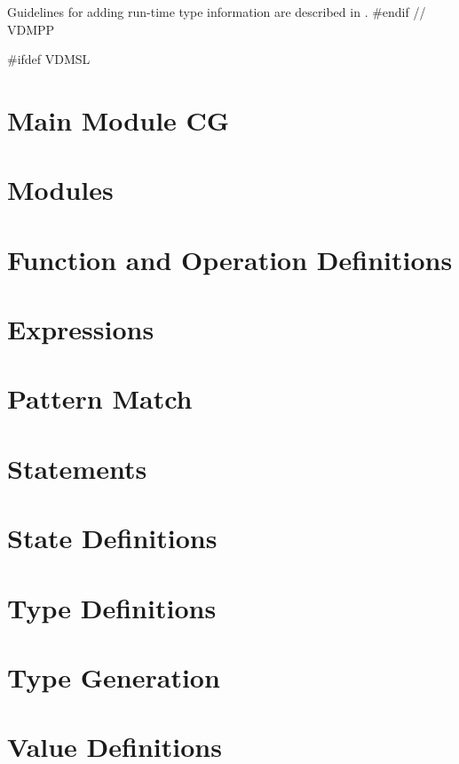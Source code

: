\documentclass[a4paper,dvips]{article}
\begin{document}
Guidelines for adding run-time type information are described in
\cite{Stroustrup91}. 
#endif // VDMPP

#ifdef VDMSL
\section{Main Module CG}\label{CG}


\section{Modules}


\section{Function and Operation Definitions}
\label{fctdef}



\section{Expressions}\label{expr}



\section{Pattern Match}\label{PM}



\section{Statements}


\section{State Definitions}


\section{Type Definitions}\label{TD}


\section{Type Generation}\label{TPGEN}


\section{Value Definitions}

\end{document}
